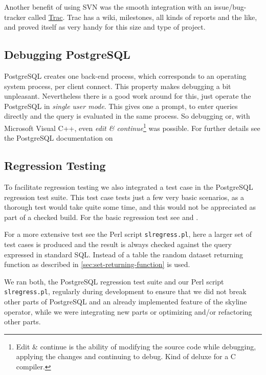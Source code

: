 Another benefit of using SVN was the smooth integration with an
issue/bug-tracker called \href{http://trac.edgewall.org/}{Trac}.  Trac
has a wiki, milestones, all kinds of reports and the like, and
proved itself as very handy for this size and type of project.

\subsection{Debugging PostgreSQL}
PostgreSQL creates one back-end process, which corresponds to an
operating system process, per client connect.  This property makes
debugging a bit unpleasant.  Nevertheless there is a good work around
for this, just operate the PostgreSQL in \emph{single user
mode}.  This gives one a prompt, to enter
queries directly and the query is evaluated in the same process.  So
debugging or, with Microsoft Visual C++, even \emph{edit \&
continue}\footnote{Edit \& continue is the
ability of modifying the source code while debugging, applying the changes
and continuing to debug.  Kind of deluxe for a C compiler.} was possible.  For further
details see the PostgreSQL documentation on

\subsection{Regression Testing}
To facilitate regression testing we also integrated a test case in the
PostgreSQL regression test suite.  This test case tests just a few
very basic scenarios, as a thorough test would take quite some time,
and this would not be appreciated as part of a checked build.  For the
basic regression test see
 and
.

For a more extensive test see the Perl script \texttt{slregress.pl},
here a larger set of test cases is produced and the result is always
checked against the query expressed in standard SQL.  Instead of a
table the random dataset returning function as described in
\autoref{sec:set-returning-function} is used.

We ran both, the PostgreSQL regression test suite and our Perl script
\texttt{slregress.pl}, regularly during development to ensure that
we did not break other parts of PostgreSQL and an already implemented
feature of the skyline operator, while we were integrating new parts
or optimizing and/or refactoring other parts.




